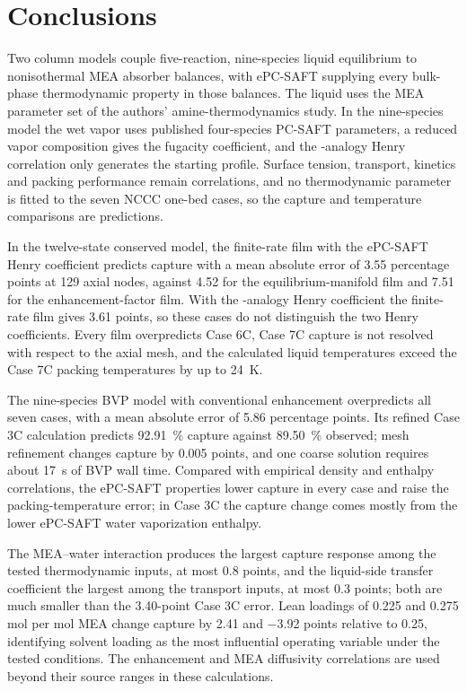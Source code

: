 \section{Conclusions}
Two column models couple five-reaction, nine-species liquid equilibrium to nonisothermal MEA absorber balances, with ePC-SAFT supplying every bulk-phase thermodynamic property in those balances.
The liquid uses the MEA parameter set of the authors' amine-thermodynamics study.
In the nine-species model the wet vapor uses published four-species PC-SAFT parameters, a reduced vapor composition gives the \COtwo{} fugacity coefficient, and the \NtwoO{}-analogy Henry correlation only generates the starting profile.
Surface tension, transport, kinetics and packing performance remain correlations, and no thermodynamic parameter is fitted to the seven NCCC one-bed cases, so the capture and temperature comparisons are predictions.

In the twelve-state conserved model, the finite-rate film with the ePC-SAFT Henry coefficient predicts capture with a mean absolute error of \num{3.55} percentage points at 129 axial nodes, against \num{4.52} for the equilibrium-manifold film and \num{7.51} for the enhancement-factor film.
With the \NtwoO{}-analogy Henry coefficient the finite-rate film gives \num{3.61} points, so these cases do not distinguish the two Henry coefficients.
Every film overpredicts Case 6C, Case 7C capture is not resolved with respect to the axial mesh, and the calculated liquid temperatures exceed the Case 7C packing temperatures by up to \qty{24}{K}.

The nine-species BVP model with conventional enhancement overpredicts all seven cases, with a mean absolute error of \num{5.86} percentage points.
Its refined Case 3C calculation predicts \qty{92.91}{\percent} capture against \qty{89.50}{\percent} observed; mesh refinement changes capture by \num{0.005} points, and one coarse solution requires about \qty{17}{s} of BVP wall time.
Compared with empirical density and enthalpy correlations, the ePC-SAFT properties lower capture in every case and raise the packing-temperature error; in Case 3C the capture change comes mostly from the lower ePC-SAFT water vaporization enthalpy.

The MEA--water interaction produces the largest capture response among the tested thermodynamic inputs, at most \num{0.8} points, and the liquid-side transfer coefficient the largest among the transport inputs, at most \num{0.3} points; both are much smaller than the \num{3.40}-point Case 3C error.
Lean loadings of 0.225 and 0.275 mol \COtwo{} per mol MEA change capture by \num{+2.41} and \num{-3.92} points relative to 0.25, identifying solvent loading as the most influential operating variable under the tested conditions.
The enhancement and MEA diffusivity correlations are used beyond their source ranges in these calculations.


